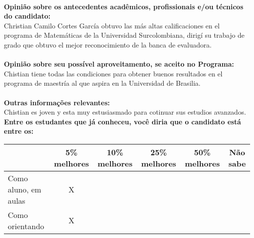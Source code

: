 \documentclass[11pt]{article}
\begin{document}
\\
\textbf{Opinião sobre os antecedentes acadêmicos, profissionais e/ou técnicos do candidato:}
\\Christian  Camilo  Cortes  García  obtuvo  las  más  altas  calificaciones
en  el  programa  de  Matemáticas de  la  Universidad  Surcolombiana, dirigí  su  trabajo  de  grado  que  obtuvo  el mejor  reconocimiento de la banca  de  evaluadora.\\
\\
\textbf{Opinião sobre seu possível aproveitamento, se aceito no Programa:}
\\Chistian  tiene  todas  las  condiciones  para  obtener  buenos  resultados en  el  programa  de  maestría al  que  aspira  en  la  Universidad de Brasilia.\\ 
\\
\textbf{Outras informações relevantes:} \\Chistian es  joven y  esta  muy  estusiasmado para cotinuar  sus  estudios avanzados.
\\[0.3cm]
\textbf{Entre os estudantes que já conheceu, você diria que o candidato está entre os:}
\\
\begin{tabular}{|l|c|c|c|c|c|}
\hline
 & 5\% melhores & 10\% melhores & 25\% melhores & 50\% melhores & Não sabe \\
\hline
Como aluno, em aulas & X &  &  &  & \\
\hline
Como orientando & X &  &  &  & \\
\hline
\end{tabular}
\end{document}
